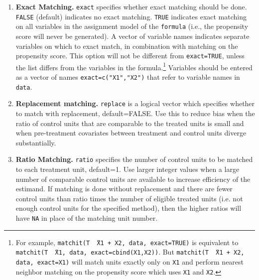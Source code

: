 \documentclass[oneside,letterpaper,titlepage]{article}
\begin{document}
\begin{enumerate}
\item \textbf{Exact Matching.}  \texttt{exact} specifies whether exact
  matching should be done.  \texttt{FALSE} (default) indicates no exact 
  matching.  \texttt{TRUE} indicates exact matching on all variables in the 
  assignment model of the \texttt{formula} (i.e., the propensity score
  will never be generated).  A vector of variable names indicates separate variables on
  which to exact match, in combination with matching on the propensity
  score.  This option will not be different from \texttt{exact=TRUE},
  unless the list differs from the variables in the formula.\footnote{For
    example, \texttt{matchit(T \~\ X1 + X2, data, exact=TRUE)} is
    equivalent to \texttt{matchit(T \~\ X1, data, exact=cbind(X1,X2))}.
    But \texttt{matchit(T \~\ X1 + X2, data, exact=X1)} will match
    units exactly only on \texttt{X1} and perform nearest neighbor
    matching on the propensity score which uses \texttt{X1} and \texttt{X2}.} 
  Variables should be entered as a vector of names 
  \texttt{exact=c("X1","X2")} that refer to variable names in \texttt{data}.
  
\item \textbf{Replacement matching.} \texttt{replace} is a logical vector which specifies whether
  to match with replacement, default=FALSE.  Use this to reduce bias
  when the ratio of control units that are comparable to the treated units
  is small and when pre-treatment covariates between treatment and
  control units diverge substantially.  

\item \textbf{Ratio Matching.}  \texttt{ratio} specifies the number of
  control units to be matched to each treatment unit, default=1.  Use
  larger integer values when a large number of comparable control units are available to
  increase efficiency of the estimand. If matching is done without replacement and there are 
  fewer control units than ratio times the number of eligible treated units (i.e. not enough control
  units for the specified method), then the higher
  ratios will have \texttt{NA} in place of the matching unit number.  


\end{enumerate}
\end{document}
